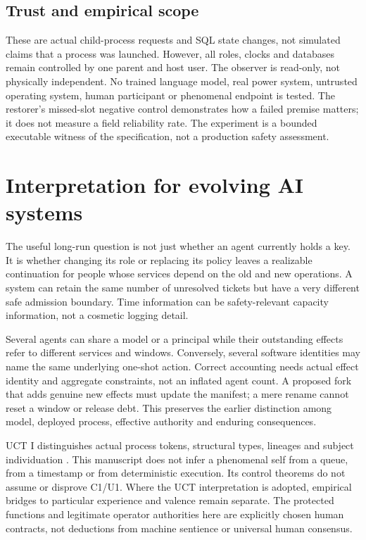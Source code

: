 \documentclass[11pt,a4paper]{article}
\theoremstyle{definition}\newtheorem{definition}{Definition}
\begin{document}
\subsection{Trust and empirical scope}
These are actual child-process requests and SQL state changes, not simulated claims that a process was launched. However, all roles, clocks and databases remain controlled by one parent and host user. The observer is read-only, not physically independent. No trained language model, real power system, untrusted operating system, human participant or phenomenal endpoint is tested. The restorer's missed-slot negative control demonstrates how a failed premise matters; it does not measure a field reliability rate. The experiment is a bounded executable witness of the specification, not a production safety assessment.

\section{Interpretation for evolving AI systems}
The useful long-run question is not just whether an agent currently holds a key. It is whether changing its role or replacing its policy leaves a realizable continuation for people whose services depend on the old and new operations. A system can retain the same number of unresolved tickets but have a very different safe admission boundary. Time information can be safety-relevant capacity information, not a cosmetic logging detail.

Several agents can share a model or a principal while their outstanding effects refer to different services and windows. Conversely, several software identities may name the same underlying one-shot action. Correct accounting needs actual effect identity and aggregate constraints, not an inflated agent count. A proposed fork that adds genuine new effects must update the manifest; a mere rename cannot reset a window or release debt. This preserves the earlier distinction among model, deployed process, effective authority and enduring consequences.

UCT I distinguishes actual process tokens, structural types, lineages and subject individuation \cite{uct}. This manuscript does not infer a phenomenal self from a queue, from a timestamp or from deterministic execution. Its control theorems do not assume or disprove C1/U1. Where the UCT interpretation is adopted, empirical bridges to particular experience and valence remain separate. The protected functions and legitimate operator authorities here are explicitly chosen human contracts, not deductions from machine sentience or universal human consensus.
\end{document}
